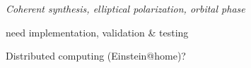 \emph{Coherent synthesis, elliptical polarization, orbital phase}


need implementation, validation \& testing


Distributed computing (Einstein@home)?





